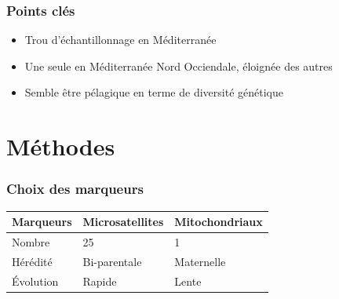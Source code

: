 \documentclass[10pt,xcolor=table]{beamer}\usepackage[]{graphicx}\usepackage[]{color}
\begin{document}
\begin{frame}
	\frametitle{Points clés}
	\begin{itemize}
		\item  <1->Trou d'échantillonnage en Méditerranée
		\item  <1->Une seule en Méditerranée Nord Occiendale, éloignée des autres
		\item  <2->Semble être pélagique en terme de diversité génétique
		\\[5.1cm]
	\end{itemize}
\end{frame}

\section{Méthodes}


\begin{frame}
	\frametitle{Choix des marqueurs}

\begin{table}	
\begin{tabular}{lll}
  \hline
Marqueurs & Microsatellites & Mitochondriaux \\
  \hline
Nombre & 25 & 1 \\
Hérédité & Bi-parentale & Maternelle \\
Évolution & Rapide & Lente \\
  \hline
\end{tabular}
\end{table}
	
\end{frame}
\end{document}
